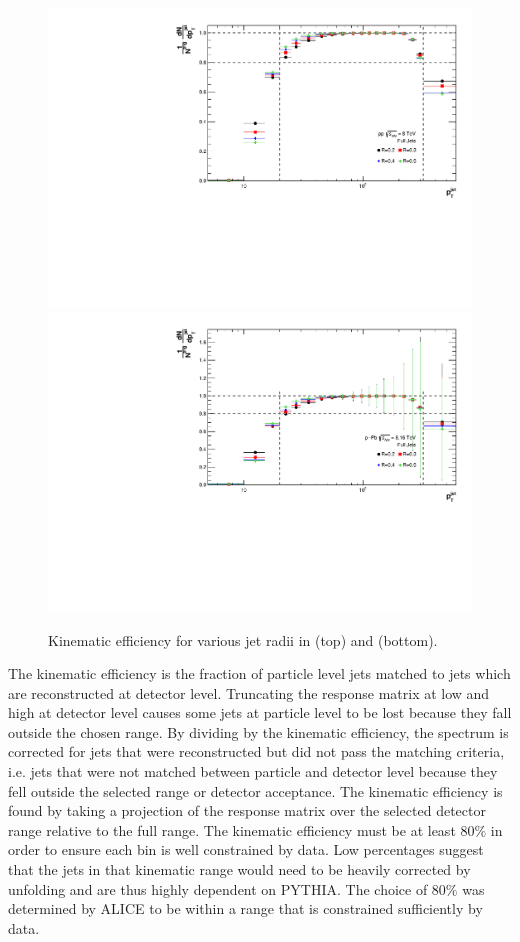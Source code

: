 \begin{figure}[hbt!]
    \centering
    \includegraphics[width=15cm]{figures/KinematicEfficiency/EffKine.pdf}
    \includegraphics[width=15cm]{figures/pPbFigures/KinematicEfficiency/EffKine.pdf}
    \caption{Kinematic efficiency for various jet radii in \pp (top) and \pPb (bottom).}
    \label{fig:KinematicEfficiency}
\end{figure}

The kinematic efficiency is the fraction of particle level jets matched to jets which are reconstructed at detector level. Truncating the response matrix at low and high \pT at detector level causes some jets at particle level to be lost because they fall outside the chosen range. By dividing by the kinematic efficiency, the spectrum is corrected for jets that were reconstructed but did not pass the matching criteria, i.e. jets that were not matched between particle and detector level because they fell outside the selected \pT range or detector acceptance. The kinematic efficiency is found by taking a projection of the response matrix over the selected detector range relative to the full range. The kinematic efficiency must be at least 80$\%$ in order to ensure each bin is well constrained by data. Low percentages suggest that the jets in that kinematic range would need to be heavily corrected by unfolding and are thus highly dependent on PYTHIA. The choice of 80$\%$ was determined by ALICE to be within a range that is constrained sufficiently by data.

